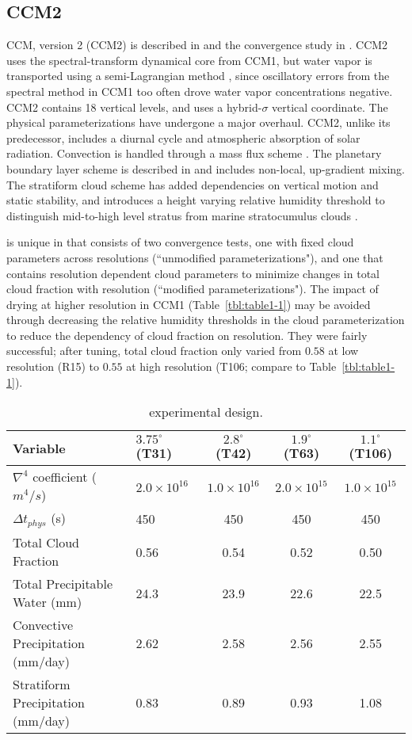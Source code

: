 \subsection{CCM2}

CCM, version 2 (CCM2) is described in \cite{CCM2} and the convergence study in \cite{WETAL1995CD}. CCM2 uses the spectral-transform dynamical core from CCM1, but water vapor is transported using a semi-Lagrangian method \citep{WR1994TELLUS}, since oscillatory errors from the spectral method in CCM1 too often drove water vapor concentrations negative. CCM2 contains 18 vertical levels, and uses a hybrid-$\sigma$ vertical coordinate. The physical parameterizations have undergone a major overhaul. CCM2, unlike its predecessor, includes a diurnal cycle and atmospheric absorption of solar radiation. Convection is handled through a mass flux scheme \citep{H1994JGR}. The planetary boundary layer scheme is described in \cite{HB1993JCLIM} and includes non-local, up-gradient mixing. The stratiform cloud scheme has added dependencies on vertical motion and static stability, and introduces a height varying relative humidity threshold to distinguish mid-to-high level stratus from marine stratocumulus clouds \citep{KETAL1994JGR}.

\cite{WETAL1995CD} is unique in that consists of two convergence tests, one with fixed cloud parameters across resolutions (``unmodified parameterizations"), and one that contains resolution dependent cloud parameters to minimize changes in total cloud fraction with resolution (``modified parameterizations"). The impact of drying at higher resolution in CCM1 (Table~\ref{tbl:table1-1}) may be avoided through decreasing the relative humidity thresholds in the cloud parameterization \citep{KETAL1994JGR} to reduce the dependency of cloud fraction on resolution. They were fairly successful; after tuning, total cloud fraction only varied from $0.58$ at low resolution (R15) to $0.55$ at high resolution (T106; compare to Table~\ref{tbl:table1-1}).

 \begin{table}
 \caption{\cite{WETAL1995CD} experimental design.}
 \centering
 \begin{tabular}{llccc}
 \hline
 Variable & $3.75^{\circ}$ (T31) & $2.8^{\circ}$ (T42) & $1.9^{\circ}$ (T63)  & $1.1^{\circ}$ (T106) \\
 \hline
   $\nabla^{4}$ coefficient ($m^4/s$) & $2.0 \times 10^{16}$ & $1.0 \times 10^{16}$ & $2.0 \times 10^{15}$ & $1.0 \times 10^{15}$ \\
   $\Delta t_{phys}$ (s) & 450 & 450 & 450 & 450 \\
   Total Cloud Fraction & 0.56 & 0.54 & 0.52 & 0.50 \\
   Total Precipitable Water (mm) & 24.3 & 23.9 & 22.6 & 22.5 \\
   Convective Precipitation (mm/day) & 2.62 & 2.58 & 2.56 & 2.55 \\
   Stratiform Precipitation (mm/day) & 0.83 & 0.89 & 0.93 & 1.08 \\   
 \hline
 \end{tabular}
 \label{tbl:table1-2}
 \end{table}

